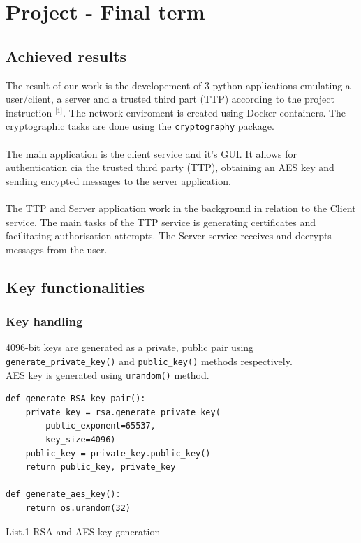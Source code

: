 \documentclass[12pt, a4paper]{report}
\begin{document}
\newpage
\section{Project - Final term}
\subsection{Achieved results}
The result of our work is the developement of 3 python applications emulating a user/client, a server and a trusted third part (TTP) according to the project instruction \(^{\text{[1]}}\). The network enviroment is created using Docker containers. The cryptographic tasks are done using the \texttt{cryptography} package.
\\\\ \noindent
The main application is the client service and it's GUI. It allows for authentication cia the trusted third party (TTP), obtaining an AES key and sending encypted messages to the server application.
\\\\ \noindent
The TTP and Server application work in the background in relation to the Client service.
The main tasks of the TTP service is generating certificates and facilitating authorisation attempts. The Server service receives and decrypts messages from the user.

\subsection{Key functionalities}

\subsubsection{Key handling}
4096-bit keys are generated as a private, public pair using \texttt{generate_private_key()} and  \texttt{public_key()} methods respectively.
\\AES key is generated using \texttt{urandom()} method.

\begin{verbatim}
def generate_RSA_key_pair():
    private_key = rsa.generate_private_key(
        public_exponent=65537,
        key_size=4096)
    public_key = private_key.public_key()
    return public_key, private_key

def generate_aes_key():
    return os.urandom(32)
\end{verbatim}
\begin{center}
List.1 RSA and AES key generation
\end{center}
\end{document}
